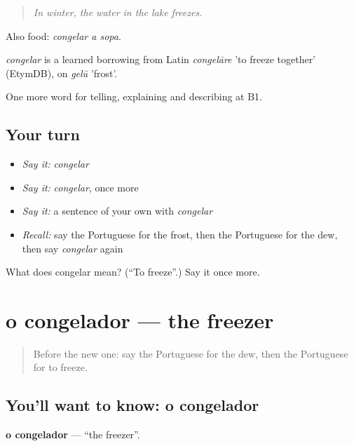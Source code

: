 \begin{quote}
\emph{In winter, the water in the lake freezes.}
\end{quote}

Also food: \emph{congelar a sopa}.

\begin{cousinweb}
\emph{congelar} is a learned borrowing from Latin \emph{congelāre} 'to freeze together' (EtymDB), on \emph{gelū} 'frost'.
\end{cousinweb}

\begin{grammarlens}[title={What you've built}]
One more word for telling, explaining and describing at B1.
\end{grammarlens}

\subsection*{Your turn}
\begin{itemize}
\raggedright
  \item \emph{Say it:} \emph{congelar}
  \item \emph{Say it:} \emph{congelar}, once more
  \item \emph{Say it:} a sentence of your own with \emph{congelar}
  \item \emph{Recall:} say the Portuguese for the frost, then the Portuguese for the dew, then say \emph{congelar} again
\end{itemize}

\begin{tcolorbox}[breakable,colback=teal!4,colframe=teal!35!black,title={Before you move on}]
What does congelar mean? (\textquotedblleft{}To freeze\textquotedblright{}.) Say it once more.
\end{tcolorbox}
\section[o congelador]{o congelador — the freezer}

\label{lesson:PT-C464-congelador}



\begin{quote}
Before the new one: say the Portuguese for the dew, then the Portuguese for to freeze.
\end{quote}

\subsection*{You'll want to know: o congelador}
\textbf{o congelador} — \textquotedblleft{}the freezer\textquotedblright{}.

